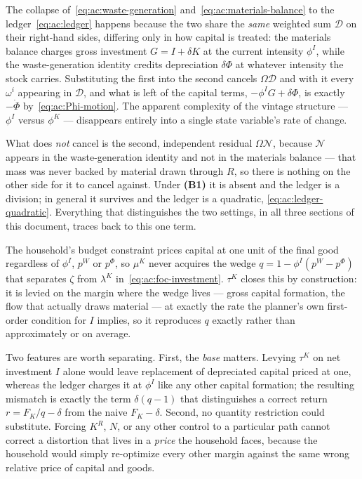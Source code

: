 \begin{remark}\label{rem:ad:cancellation}
The collapse of~\eqref{eq:ac:waste-generation} and~\eqref{eq:ac:materials-balance} to the ledger~\eqref{eq:ac:ledger} happens because the two share the \emph{same} weighted sum $\mathcal D$ on their right-hand sides, differing only in how capital is treated: the materials balance charges gross investment $G=I+\delta K$ at the current intensity $\phi^I$, while the waste-generation identity credits depreciation $\delta\Phi$ at whatever intensity the stock carries. Substituting the first into the second cancels $\Omega\mathcal D$ and with it every $\omega^i$ appearing in $\mathcal D$, and what is left of the capital terms, $-\phi^IG+\delta\Phi$, is exactly $-\dot\Phi$ by~\eqref{eq:ac:Phi-motion}. The apparent complexity of the vintage structure --- $\phi^I$ versus $\phi^K$ --- disappears entirely into a single state variable's rate of change.

What does \emph{not} cancel is the second, independent residual $\Omega\mathcal N$, because $\mathcal N$ appears in the waste-generation identity and not in the materials balance --- that mass was never backed by material drawn through $R$, so there is nothing on the other side for it to cancel against. Under \textbf{(B1)} it is absent and the ledger is a division; in general it survives and the ledger is a quadratic, \eqref{eq:ac:ledger-quadratic}. Everything that distinguishes the two settings, in all three sections of this document, traces back to this one term.
\end{remark}

\begin{remark}\label{rem:ad:q}
The household's budget constraint prices capital at one unit of the final good regardless of $\phi^I$, $p^W$ or $p^\Phi$, so $\mu^K$ never acquires the wedge $q=1-\phi^I\left(p^W-p^\Phi\right)$ that separates $\zeta$ from $\lambda^K$ in~\eqref{eq:ac:foc-investment}. $\tau^K$ closes this by construction: it is levied on the margin where the wedge lives --- gross capital formation, the flow that actually draws material --- at exactly the rate the planner's own first-order condition for $I$ implies, so it reproduces $q$ exactly rather than approximately or on average.

Two features are worth separating. First, the \emph{base} matters. Levying $\tau^K$ on net investment $I$ alone would leave replacement of depreciated capital priced at one, whereas the ledger charges it at $\phi^I$ like any other capital formation; the resulting mismatch is exactly the term $\delta\left(q-1\right)$ that distinguishes a correct return $r=F_K/q-\delta$ from the naive $F_K-\delta$. Second, no quantity restriction could substitute. Forcing $K^R$, $N$, or any other control to a particular path cannot correct a distortion that lives in a \emph{price} the household faces, because the household would simply re-optimize every other margin against the same wrong relative price of capital and goods.
\end{remark}

